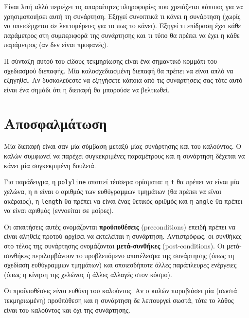 \documentclass[10pt]{book}
\begin{document}
Είναι λιτή αλλά περιέχει τις απαραίτητες πληροφορίες που χρειάζεται κάποιος για να χρησιμοποιήσει αυτή τη συνάρτηση. Εξηγεί συνοπτικά τι κάνει η συνάρτηση (χωρίς να υπεισέρχεται σε λεπτομέρειες για το πως το κάνει). Εξηγεί τι επίδραση έχει κάθε παράμετρος στη συμπεριφορά της συνάρτησης και τι τύπο θα πρέπει να έχει η κάθε παράμετρος (αν δεν είναι προφανές).

Η σύνταξη αυτού του είδους τεκμηρίωσης είναι ένα σημαντικό κομμάτι του σχεδιασμού διεπαφής. Μία καλοσχεδιασμένη διεπαφή θα πρέπει να είναι απλό να εξηγηθεί. Αν δυσκολεύεστε να εξηγήσετε κάποια από τις συναρτήσεις σας τότε αυτό είναι ένα σημάδι ότι η διεπαφή θα μπορούσε να βελτιωθεί.



\section{Αποσφαλμάτωση}

Μία διεπαφή είναι σαν μία σύμβαση μεταξύ μίας συνάρτησης και του καλούντος.
Ο καλών συμφωνεί να παρέχει συγκεκριμένες παραμέτρους και η συνάρτηση δέχεται να κάνει μία συγκεκριμένη δουλειά.

Για παράδειγμα, η {\tt polyline} απαιτεί τέσσερα ορίσματα: η {\tt t} θα πρέπει
να είναι μία χελώνα, η {\tt n} είναι ο αριθμός των ευθύγραμμων τμημάτων (θα πρέπει να είναι ακέραιος), η {\tt length} θα πρέπει να είναι ένας θετικός αριθμός και η {\tt angle} θα πρέπει να είναι αριθμός (εννοείται σε μοίρες).

Οι απαιτήσεις αυτές ονομάζονται {\bf προϋποθέσεις} (preconditions) επειδή πρέπει να είναι αληθείς προτού αρχίσει να εκτελείται η συνάρτηση. Αντιστρόφως, οι συνθήκες στο τέλος της συνάρτησης ονομάζονται {\bf μετά-συνθήκες} (post-conditions). Οι μετά-συνθήκες περιλαμβάνουν το προβλεπόμενο αποτέλεσμα της συνάρτησης (όπως τη σχεδίαση ευθύγραμμων τμημάτων) και οποιεσδήποτε άλλες παράπλευρες ενέργειες (όπως η κίνηση της χελώνας ή άλλες αλλαγές στον κόσμο).

Οι προϋποθέσεις είναι ευθύνη του καλούντος. Αν ο καλών παραβιάσει μία
(σωστά τεκμηριωμένη) προϋπόθεση και η συνάρτηση δε λειτουργεί σωστά,
τότε το λάθος είναι του καλούντος και όχι της συνάρτησης.

\end{document}
